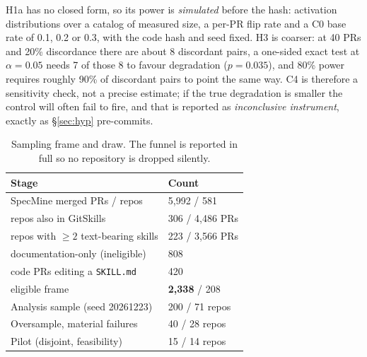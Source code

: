 \documentclass[10pt,conference]{IEEEtran}
\begin{document}
H1a has no closed form, so its power is \emph{simulated} before the hash: activation distributions over a catalog of measured size, a per-PR flip rate and a C0 base rate of 0.1, 0.2 or 0.3, with the code hash and seed fixed. H3 is coarser: at 40 PRs and 20\% discordance there are about 8 discordant pairs, a one-sided exact test at $\alpha=0.05$ needs 7 of those 8 to favour degradation ($p=0.035$), and 80\% power requires roughly 90\% of discordant pairs to point the same way. C4 is therefore a sensitivity check, not a precise estimate; if the true degradation is smaller the control will often fail to fire, and that is reported as \emph{inconclusive instrument}, exactly as \S\ref{sec:hyp} pre-commits.

\begin{table}[t]
\caption{Sampling frame and draw. The funnel is reported in full so no repository is dropped silently.}
\label{tab:frame}
\centering
\scriptsize
\begin{tabular}{@{}p{5.3cm}p{2.9cm}@{}}
\toprule
Stage & Count \\
\midrule
SpecMine merged PRs / repos & 5{,}992 / 581 \\
\quad repos also in GitSkills & 306 / 4{,}486 PRs \\
\quad repos with $\geq 2$ text-bearing skills & 223 / 3{,}566 PRs \\
\quad\quad documentation-only (ineligible) & 808 \\
\quad\quad code PRs editing a \texttt{SKILL.md} & 420 \\
\quad eligible frame & \textbf{2{,}338} / 208 \\
\midrule
Analysis sample (seed 20261223) & 200 / 71 repos \\
Oversample, material failures & 40 / 28 repos \\
Pilot (disjoint, feasibility) & 15 / 14 repos \\
\bottomrule
\end{tabular}
\end{table}
\end{document}
